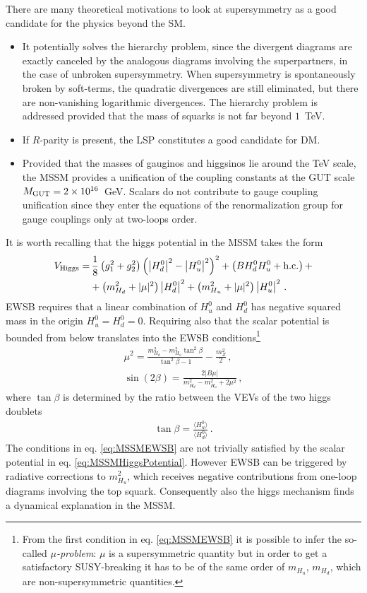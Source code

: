 \documentclass[12pt,a4paper]{book}
\newcommand{\bi}{\begin{itemize}}
\newcommand{\ei}{\end{itemize}}
\begin{document}
There are many theoretical motivations to look at supersymmetry as a good candidate for the physics beyond the SM.
\bi
\item It potentially solves the hierarchy problem, since the divergent diagrams are exactly canceled by the analogous diagrams involving the superpartners, in the case of unbroken supersymmetry. When supersymmetry is spontaneously broken by soft-terms, the quadratic divergences are still eliminated, but there are non-vanishing logarithmic divergences. The hierarchy problem is addressed provided that the mass of squarks is not far beyond $1 \,$ TeV.
\item If $R$-parity is present, the LSP constitutes a good candidate for DM.
\item Provided that the masses of gauginos and higgsinos lie around the TeV scale, the MSSM provides a unification of the coupling constants at the GUT scale $M_{\rm GUT} = 2 \times 10^{16} \,$ GeV. Scalars do not contribute to gauge coupling unification since they enter the equations of the renormalization group for gauge couplings only at two-loops order.
\ei

It is worth recalling that the higgs potential in the MSSM takes the form
\begin{align}
\label{eq:MSSMHiggsPotential}
V_{\rm Higgs} =&\, \frac{1}{8} \left(g_1^2 + g_2^2\right) \left(\left|H_d^0\right|^2-\left|H_u^0\right|^2\right)^2 + \left(B H_d^0 H_u^0 + \text{h.c.}\right) + \nonumber \\
&+ \left(m_{H_d}^2 + |\mu|^2\right) \left|H_d^0\right|^2 + \left(m_{H_u}^2 + |\mu|^2\right) \left|H_u^0\right|^2  \,.
\end{align}
EWSB requires that a linear combination of $H_u^0$ and $H_d^0$ has negative squared mass in the origin $H_u^0 = H_d^0 = 0$. Requiring also that the scalar potential is bounded from below translates into the EWSB conditions\footnote{From the first condition in eq. \eqref{eq:MSSMEWSB} it is possible to infer the so-called \textit{$\mu$-problem}: $\mu$ is a supersymmetric quantity but in order to get a satisfactory SUSY-breaking it has to be of the same order of $m_{H_u}$, $m_{H_d}$, which are non-supersymmetric quantities.}
\begin{align}
\label{eq:MSSMEWSB}
\mu^2 = \frac{m_{H_d}^2 - m_{H_u}^2 \tan^2 \beta}{\tan^2 \beta - 1} - \frac{m_Z^2}{2} \,, \nonumber \\
\sin\left(2 \beta\right) = \frac{2 \left|B \mu\right|}{m_{H_d}^2 - m_{H_u}^2 + 2 \mu^2} \,,
\end{align}
where $\tan \beta$ is determined by the ratio between the VEVs of the two higgs doublets
\begin{align}
\label{eq:TanBeta}
\tan \beta = \frac{\langle H_u^0 \rangle}{\langle H_d^0 \rangle}\,.
\end{align}
The conditions in eq. \eqref{eq:MSSMEWSB} are not trivially satisfied by the scalar potential in eq. \eqref{eq:MSSMHiggsPotential}. However EWSB can be triggered by radiative corrections to $m_{H_u}^2$, which receives negative contributions from one-loop diagrams involving the top squark. Consequently also the higgs mechanism finds a dynamical explanation in the MSSM.\\
\end{document}
